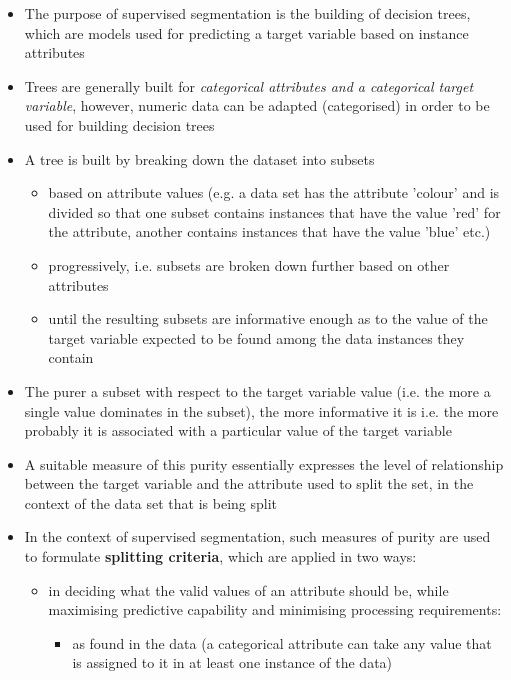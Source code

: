 \begin{itemize}
  \item The purpose of supervised segmentation is the building of decision trees, which are models used for predicting a target variable based on instance attributes
  \item Trees are generally built for \emph{categorical attributes and a categorical target variable}, however, numeric data can be adapted (categorised) in order to be used for building decision trees
  \item A tree is built by breaking down the dataset into subsets
    \begin{itemize}
    \item based on attribute values (e.g. a data set  has the attribute 'colour' and is divided so that one subset contains instances that have the value 'red' for the attribute, another contains instances that have the value 'blue' etc.)
    \item progressively, i.e. subsets are broken down further based on other attributes
    \item until the resulting subsets are informative enough as to the value of the target variable expected to be found among the data instances they contain
    \end{itemize}
  \item The purer a subset with respect to the target variable value (i.e. the more a single value dominates in the subset), the more informative it is i.e. the more probably it is associated with a particular value of the target variable
  \item A suitable measure of this purity essentially expresses the level of relationship between the target variable and the attribute used to split the set, in the context of the data set that is being split 
  \item In the context of supervised segmentation, such measures of purity are used to formulate \textbf{splitting criteria}, which are applied in two ways: 
    \begin{itemize}
    \item in deciding what the valid values of an attribute should be, while maximising predictive capability and minimising processing requirements:
      \begin{itemize}
      \item as found in the data (a categorical attribute can take any value that is assigned to it in at least one instance of the data)

\end{itemize}
\end{itemize}
\end{itemize}
